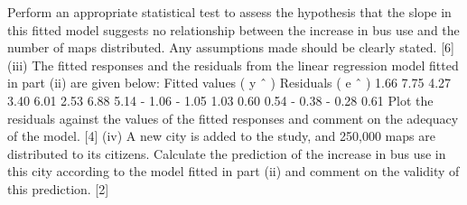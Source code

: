 \documentclass[a4paper,12pt]{article}
\begin{document}
\begin{enumerate}
Perform an appropriate statistical test to assess the hypothesis that the slope in this fitted model suggests no relationship between the increase in bus use and the number of maps distributed. Any assumptions made should be clearly
stated.
[6]
(iii) The fitted responses and the residuals from the linear regression model fitted
in part (ii) are given below:
Fitted values ( y ˆ )
Residuals ( e ˆ )
1.66 7.75 4.27 3.40 6.01 2.53 6.88 5.14
- 1.06 - 1.05 1.03 0.60 0.54 - 0.38 - 0.28 0.61
Plot the residuals against the values of the fitted responses and comment on
the adequacy of the model.
[4]
(iv)
A new city is added to the study, and 250,000 maps are distributed to its
citizens.
Calculate the prediction of the increase in bus use in this city according to the
model fitted in part (ii) and comment on the validity of this prediction.
[2]



\end{enumerate}
\end{document}
